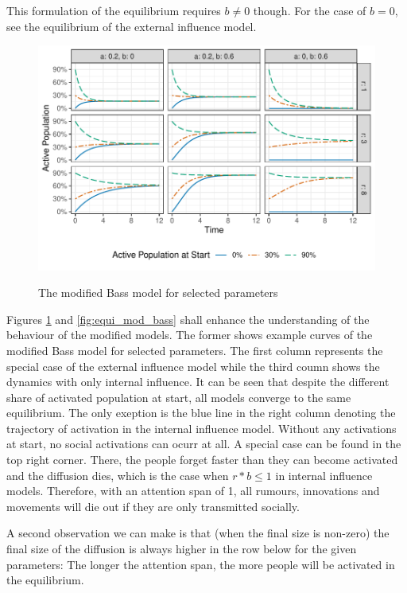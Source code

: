 \documentclass[a4paper,12pt]{article}
\begin{document}
This formulation of the equilibrium requires $b \neq 0$ though. For the case of $b = 0$, see the equilibrium of the external influence model.  

\bigskip

\begin{figure}
\caption{The modified Bass model for selected parameters}
\includegraphics[width=\linewidth]{images/examples_mod_bass.pdf}
\label{fig:examples_mod_bass}
\end{figure}

Figures \ref{fig:examples_mod_bass} and \ref{fig:equi_mod_bass} shall enhance the understanding of the behaviour of the modified models. The former shows example curves of the modified Bass model for selected parameters. The first column represents the special case of the external influence model while the third coumn shows the dynamics with only internal influence. It can be seen that despite the different share of activated population at start, all models converge to the same equilibrium. The only exeption is the blue line in the right column denoting the trajectory of activation in the internal influence model. Without any activations at start, no social activations can ocurr at all. A special case can be found in the top right corner. There, the people forget faster than they can become activated and the diffusion dies, which is the case when $r * b \leq 1$ in internal influence models. Therefore, with an attention span of 1, all rumours, innovations and movements will die out if they are only transmitted socially.

A second observation we can make is that (when the final size is non-zero) the final size of the diffusion is always higher in the row below for the given parameters: The longer the attention span, the more people will be activated in the equilibrium.
\end{document}
